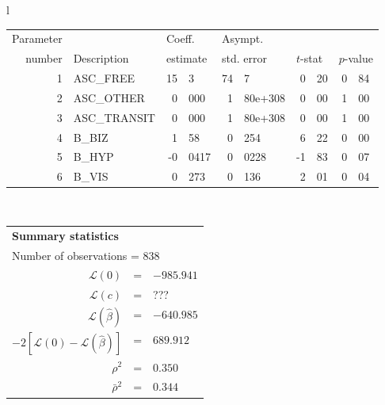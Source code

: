   \begin{tabular}{l}
\begin{tabular}{rlr@{.}lr@{.}lr@{.}lr@{.}l}
Parameter &                       &   \multicolumn{2}{l}{Coeff.}      & \multicolumn{2}{l}{Asympt.}  &     \multicolumn{4}{l}{}   \\
number &  Description                     &   \multicolumn{2}{l}{estimate}      & \multicolumn{2}{l}{std. error}  &   \multicolumn{2}{l}{$t$-stat}  &   \multicolumn{2}{l}{$p$-value}   \\

\hline

1 & ASC\_FREE & 15&3 & 74&7 & 0&20 & 0&84 \\
2 & ASC\_OTHER & 0&000 & 1&80e+308 & 0&00 & 1&00 \\
3 & ASC\_TRANSIT & 0&000 & 1&80e+308 & 0&00 & 1&00 \\
4 & B\_BIZ & 1&58 & 0&254 & 6&22 & 0&00 \\
5 & B\_HYP & -0&0417 & 0&0228 & -1&83 & 0&07 \\
6 & B\_VIS & 0&273 & 0&136 & 2&01 & 0&04 \\
\hline

\end{tabular}
\\
\begin{tabular}{rcl}
\multicolumn{3}{l}{\bf Summary statistics}\\
\multicolumn{3}{l}{ Number of observations = $838$} \\
 $\mathcal{L}(0)$ &=&  $-985.941$ \\
 $\mathcal{L}(c)$ &=& ???\\
 $\mathcal{L}(\hat{\beta})$ &=& $-640.985 $  \\
 $-2[\mathcal{L}(0) -\mathcal{L}(\hat{\beta})]$ &=& $689.912$ \\
    $\rho^2$ &=&   $0.350$ \\
    $\bar{\rho}^2$ &=&    $0.344$ \\
\end{tabular}
\end{tabular}

